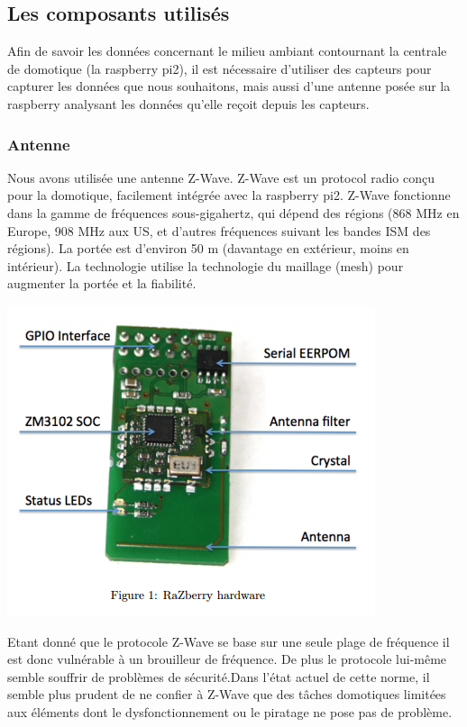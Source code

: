 \subsection{Les composants utilisés}
Afin de savoir les données concernant le milieu ambiant contournant la centrale de domotique (la raspberry pi2), il est nécessaire d'utiliser des capteurs pour capturer les données que nous souhaitons, mais aussi d'une antenne posée sur la raspberry analysant les données qu'elle reçoit depuis les capteurs.

\subsubsection{Antenne}
Nous avons utilisée une antenne Z-Wave. Z-Wave est un protocol radio conçu pour la domotique, facilement intégrée avec la raspberry pi2. Z-Wave fonctionne dans la gamme de fréquences sous-gigahertz, qui dépend des régions (868 MHz en Europe, 908 MHz aux US, et d'autres fréquences suivant les bandes ISM des régions). La portée est d'environ 50 m (davantage en extérieur, moins en intérieur). La technologie utilise la technologie du maillage (mesh) pour augmenter la portée et la fiabilité.

\includegraphics[scale=0.5]{./Images/png/Zwave.png}\newline

Etant donné que le protocole Z-Wave se base sur une seule plage de fréquence il est donc vulnérable à un brouilleur de fréquence.
 De plus le protocole lui-même semble souffrir de problèmes de sécurité.Dans l'état actuel de cette norme, il semble plus prudent de ne confier à Z-Wave que des tâches domotiques limitées aux éléments dont le dysfonctionnement ou le piratage ne pose pas de problème.
